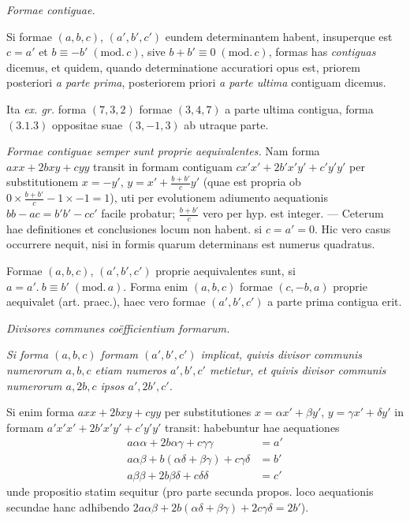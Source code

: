 \begin{center}
\textit{Formae contiguae.}
\end{center}
Si formae \((a,b,c)\), \((a',b',c')\) eundem determinantem habent, insuperque est \(c=a'\) et \(b\equiv-b'\; (\mathrm{mod.}\,c)\), sive \(b+b'\equiv0\; (\mathrm{mod.}\,c)\), formas has \textit{contiguas} dicemus, et quidem, quando determinatione accuratiori opus est, priorem posteriori \textit{a parte prima}, posteriorem priori \textit{a parte ultima} contiguam dicemus.

Ita \textit{ex. gr.} forma \((7,3,2)\) formae \((3,4,7)\) a parte ultima contigua, forma \((3.1.3)\) oppositae suae \((3,-1,3)\) ab utraque parte.

\textit{Formae contiguae semper sunt proprie aequivalentes.} Nam forma \(axx+2bxy+cyy\) transit in formam contiguam \(cx'x'+2b'x'y'+c'y'y'\) per substitutionem \(x=-y'\), \(y=x'+\frac{b+b'}{c}y'\) (quae est propria ob \(0\times\frac{b+b'}{c}-1\times-1=1\)), uti per evolutionem adiumento aequationis \(bb-ac=b'b'-cc'\) facile probatur; \(\frac{b+b'}{c}\) vero per hyp. est integer. --- Ceterum hae definitiones et conclusiones locum non habent. si \(c=a'=0\). Hic vero casus occurrere nequit, nisi in formis quarum determinans est numerus quadratus.

Formae \((a,b,c)\), \((a',b',c')\) proprie aequivalentes sunt, si \(a=a'.\ b\equiv b'\; (\mathrm{mod.}\,a)\). Forma enim \((a,b,c)\) formae \((c,-b,a)\) proprie aequivalet (art. praec.), haec vero formae \((a',b',c')\) a parte prima contigua erit.

\begin{center}
\textit{Divisores communes co\"efficientium formarum.}
\end{center}
\textit{Si forma \((a,b,c)\) formam \((a',b',c')\) implicat, quivis divisor communis numerorum \(a,b,c\) etiam numeros \(a',b',c'\) metietur, et quivis divisor communis numerorum \(a,2b,c\) ipsos \(a',2b',c'\).}

Si enim forma \(axx+2bxy+cyy\) per substitutiones \(x=\alpha x'+\beta y'\), \(y=\gamma x'+\delta y'\) in formam \(a'x'x'+2b'x'y'+c'y'y'\) transit: habebuntur hae aequationes
\[
\begin{aligned}
a\alpha\alpha+2b\alpha\gamma+c\gamma\gamma&=a'\\
a\alpha\beta+b(\alpha\delta+\beta\gamma)+c\gamma\delta&=b'\\
a\beta\beta+2b\beta\delta+c\delta\delta&=c'
\end{aligned}
\]
unde propositio statim sequitur (pro parte secunda propos. loco aequationis secundae hanc adhibendo \(2a\alpha\beta+2b(\alpha\delta+\beta\gamma)+2c\gamma\delta=2b'\)).

